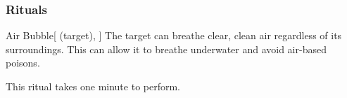 \subsubsection{Rituals}


\lowercase{\hypertarget{spell:Air Bubble}{}}\label{spell:Air Bubble}
\begin{attuneability}[Rank 3]{\hypertarget{spell:Air Bubble}{Air Bubble}}[ (target), ]
The target can breathe clear, clean air regardless of its surroundings.
This can allow it to breathe underwater and avoid air-based poisons.

This ritual takes one minute to perform.
\end{attuneability}
\vspace{0.25em}


